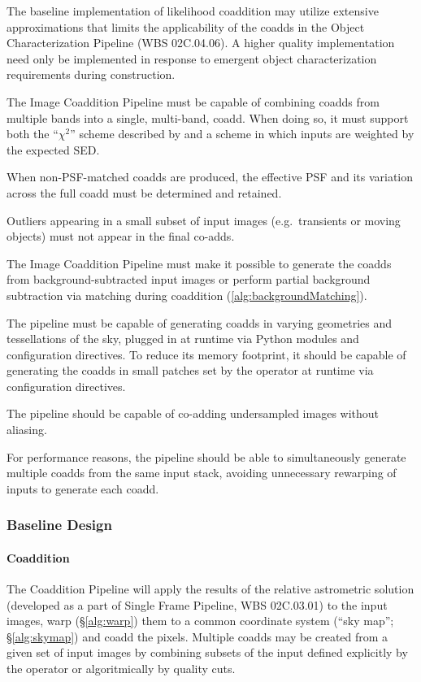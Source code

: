 \documentclass[12pt]{article}
\newcommand{\wbsSFM}{WBS 02C.03.01}
\newcommand{\wbsObjChar}{WBS 02C.04.06}
\begin{document}
The baseline implementation of likelihood coaddition may utilize extensive approximations that limits the applicability of the coadds in the Object Characterization Pipeline (\wbsObjChar). A higher quality implementation need only be implemented in response to emergent object characterization requirements during construction.

The Image Coaddition Pipeline must be capable of combining coadds from multiple bands into a single, multi-band, coadd. When doing so, it must support both the ``$\chi^2$'' scheme described by \cite{Szalay99} and a scheme in which inputs are weighted by the expected SED.

When non-PSF-matched coadds are produced, the effective PSF and its variation across the full coadd must be determined and retained.

Outliers appearing in a small subset of input images (e.g.\ transients or moving objects) must not appear in the final co-adds. %

The Image Coaddition Pipeline must make it possible to generate the coadds from background-subtracted input images or perform partial background subtraction via matching during coaddition (\ref{alg:backgroundMatching}).

The pipeline must be capable of generating coadds in varying geometries and tessellations of the sky, plugged in at runtime via Python modules and configuration directives. To reduce its memory footprint, it should be capable of generating the coadds in small patches set by the operator at runtime via configuration directives.

The pipeline should be capable of co-adding undersampled images without aliasing.

For performance reasons, the pipeline should be able to simultaneously generate multiple coadds from the same input stack, avoiding unnecessary rewarping of inputs to generate each coadd.

\subsubsection{Baseline Design}

\paragraph{Coaddition}
\label{alg:coadd}

The Coaddition Pipeline will apply the results of the relative astrometric solution (developed as a part of Single Frame Pipeline, \wbsSFM) to the input images, warp (\S\ref{alg:warp}) them to a common coordinate system (``sky map''; \S\ref{alg:skymap}) and coadd the pixels. Multiple coadds may be created from a given set of input images by combining subsets of the input defined explicitly by the operator or algoritmically by quality cuts.
\end{document}
